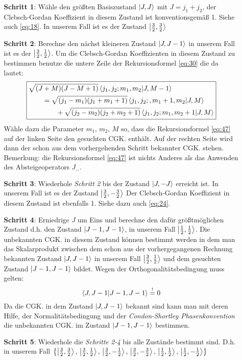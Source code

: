 \begin{itemize}
\item[\textbf{Schritt 1}:] Wähle den größten Basiszustand \(\left| J,J \right\rangle\) mit \(J=j_1+j_2\), der
  Clebsch-Gordan Koeffizient in diesem Zustand ist konventionsgemäß 1. Siehe
auch \eqref{eq:18}. In unserem Fall ist es der Zustand \(\left| \frac 3 2, \frac 3
2 \right\rangle\)
\item[\textbf{Schritt 2}:] Berechne den nächst kleineren Zustand \(\left| J, J-1 \right\rangle\) in
  unserem Fall ist es der \(\left| \frac 3 2, \frac 1 2 \right\rangle\). Um die Clebsch-Gordan
  Koeffizienten in diesem Zustand zu bestimmen benutze die untere Zeile der
  Rekursionsformel \eqref{eq:30} die da lautet:
  \begin{equation}
    \label{eq:47}
    \boxed{
    \begin{split}
      &\sqrt{(J+ M)
        (J- M+1)}\braket{j_1,j_2;m_1,m_2}{J,M- 1}\\
      &\qquad
      = \sqrt{(j_1- m_1)(j_1+m_1+1)}
      \braket{j_1,j_2;,m_1+ 1,m_2}{J,M}\\
      &\qquad\qquad
      +\sqrt{(j_2- m_2)(j_2+ m_2+1)}
      \braket{j_1,j_2;m_1,m_2+ 1}{J,M}
    \end{split}}
  \end{equation}
Wähle dazu die Parameter \(m_1,\, m_2,\, M\) so, dass die Rekursionsformel
\eqref{eq:47} auf der linken Seite den gesuchten CGK. enthält. Auf der rechten
Seite wird dann der schon aus dem vorhergehenden Schritt bekannter CGK. stehen.
Bemerkung: die Rekursionsformel \eqref{eq:47} ist nichts Anderes als das
Anwenden des Absteigeoperators \(J_-\).
\item[\textbf{Schritt 3}:] Wiederhole \emph{Schritt 2} bis der Zustand
  \(\left| J,-J \right\rangle\) erreicht ist. In unserem Fall ist es der Zustand \(\left| \frac 3
  2, -\frac 3 2 \right\rangle\) Der Clebsch-Gordan Koeffizient in diesem Zustand
  ist ebenfalls 1. Siehe dazu auch \eqref{eq:24}.
\item[\textbf{Schritt 4}:] Erniedrige \(J\) um Eins und berechne den dafür
  größtmöglichen Zustand d.h. den Zustand \(\left| J-1,J-1 \right\rangle\), in unserem Fall
  \(\left| \frac 1 2, \frac 1 2 \right\rangle\). Die unbekannten CGK. in diesem Zustand können
  bestimmt werden in dem man das Skalarprodukt zwischen dem schon aus der
  vorhergegangenen Rechnung bekannten Zustand \(\left| J,J-1 \right\rangle\) in unserem Fall
  \(\left| \frac 3 2, \frac 1 2 \right\rangle\) und dem gesuchten  Zustand \(\left| J-1,J-1 \right\rangle\)
  bildet. Wegen der Orthogonalitätsbedingung muss gelten:
  \begin{equation}
    \label{eq:48}
    \braket{J,J-1}{J-1,J-1}\stackrel{!}=0
  \end{equation}
  Da die CGK. in dem Zustand \(\left| J,J-1 \right\rangle\) bekannt sind kann man mit deren Hilfe,
  der Normalitätsbedingung und der \emph{Condon-Shortley Phasenkonvention} die
  unbekannten CGK. im Zustand \(\left| J-1,J-1 \right\rangle\) bestimmen.
\item[\textbf{Schritt 5}:] Wiederhole die \emph{Schritte 2-4} bis alle Zustände
  bestimmt sind. D.h. in unserem Fall \(\left\{\left| \frac 3 2, \frac 3 2 \right\rangle,\,\left| \frac 3 2,
    \frac 1 2 \right\rangle,\,\left| \frac 3 2, -\frac 1 2 \right\rangle,\, \left| \frac 3 2, -\frac 3
    2 \right\rangle,\,\left| \frac 1 2, \frac 1 2 \right\rangle,\,\left| \frac 1 2, -\frac 1 2 \right\rangle \right\}\)
\end{itemize}

